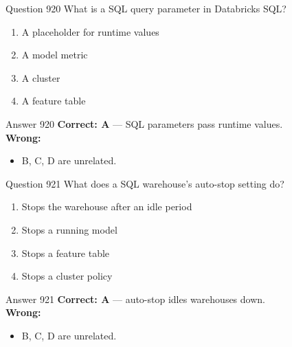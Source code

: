 \documentclass[aspectratio=169,11pt]{beamer}
\begin{document}
	\begin{frame}{Question 920}
		What is a SQL query parameter in Databricks SQL?
		\begin{enumerate}[label=\Alph*.]
			\item A placeholder for runtime values
			\item A model metric
			\item A cluster
			\item A feature table
		\end{enumerate}
	\end{frame}
	\begin{frame}{Answer 920}
		\textbf{Correct: A} --- SQL parameters pass runtime values.\\
		\vspace{0.5em}
		\textbf{Wrong:}
		\begin{itemize}
			\item B, C, D are unrelated.
		\end{itemize}
	\end{frame}
	
	\begin{frame}{Question 921}
		What does a SQL warehouse's auto-stop setting do?
		\begin{enumerate}[label=\Alph*.]
			\item Stops the warehouse after an idle period
			\item Stops a running model
			\item Stops a feature table
			\item Stops a cluster policy
		\end{enumerate}
	\end{frame}
	\begin{frame}{Answer 921}
		\textbf{Correct: A} --- auto-stop idles warehouses down.\\
		\vspace{0.5em}
		\textbf{Wrong:}
		\begin{itemize}
			\item B, C, D are unrelated.
		\end{itemize}
	\end{frame}
	
\end{document}
